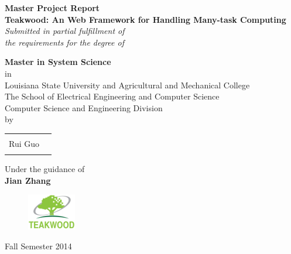 \begin{titlepage}

\begin{center}

\textup{\bf Master Project Report} \\[0.2in]

\Large \textbf {Teakwood: An Web Framework for Handling Many-task Computing}\\[0.5in]

       \small \emph{Submitted in partial fulfillment of\\
        the requirements for the degree of}
        \vspace{.2in}

       {\bf Master in System Science} \\in\\Louisiana State University and Agricultural and Mechanical College\\ The School of Electrical Engineering and Computer Science\\
Computer Science and Engineering Division\\[0.5in]

\normalsize by \\
\begin{table}[h]
\centering
\begin{tabular}{lr}\hline \\
Rui Guo \\ \\ \hline
 
\end{tabular}
\end{table}

\vspace{.1in}
Under the guidance of\\
{\textbf{Jian Zhang}}\\[0.2in]

\vfill

\begin{figure}[htb]
\centering
\includegraphics[scale=0.6]{./logo}
\label{fig:label} %
\end{figure}



Fall Semester 2014

\end{center}
\end{titlepage}
